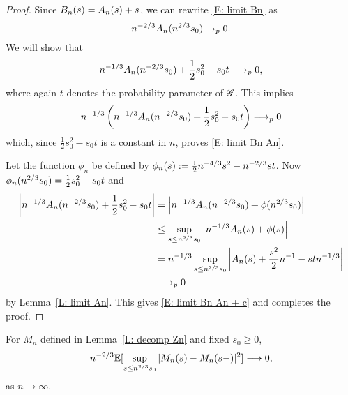 \begin{proof} \label{P: limit Bn}
	Since $B_n(s) = A_n(s) + s$, we can rewrite \eqref{E: limit Bn} as
	\begin{equation} \label{E: limit Bn An}
	n^{-2 / 3} A_n(n^{2 / 3}s_0) \rightarrow_p 0.
	\end{equation}
	We will show that
	\begin{equation} \label{E: limit Bn An + c}
	n^{-1 / 3} A_n(n^{-2 / 3}s_0) + \frac{1}{2}s_0^2 - s_0t \longrightarrow_p 0,
	\end{equation}
	where again $t$ denotes the probability parameter of $\mathscr{G}$. 
	This implies
	\begin{equation*}
	n^{-1 / 3} \left( n^{-1 / 3} A_n(n^{-2 / 3}s_0) + \frac{1}{2}s_0^2 - s_0t \right) \longrightarrow_p 0
	\end{equation*}
	which, since $\frac{1}{2}s_0^2 - s_0t$ is a constant in $n$, proves \eqref{E: limit Bn An}.
	
	Let the function $\phi_n$ be defined by $\phi_n(s) := \frac{1}{2}n^{-4 / 3}s^2 - n^{-2 / 3}st$.	
	Now $\phi_n(n^{2 / 3}s_0) = \frac{1}{2}s_0^2 - s_0t$ and
	\begin{align*}
	\left| n^{-1 / 3} A_n(n^{-2 / 3}s_0) + \frac{1}{2}s_0^2 - s_0t \right| 
	&= \left| n^{-1 / 3} A_n(n^{-2 / 3}s_0) + \phi(n^{2 / 3}s_0) \right| \\
	&\leq \sup_{s \leq n^{2 / 3} s_0 } \left| n^{-1 / 3} A_n(s) + \phi(s) \right| \\
	&= n^{-1 / 3} \sup_{s \leq n^{2 / 3} s_0 } \left| A_n(s) + \frac{s^2}{2}n^{-1} - stn^{-1 / 3} \right| \\
	&\longrightarrow_p 0
	\end{align*}
	by Lemma~\ref{L: limit An}. This gives \eqref{E: limit Bn An + c} and completes the proof.
\end{proof}


\begin{lemma} \label{L: limit Mn}
	For $M_n$ defined in Lemma~\ref{L: decomp Zn} and fixed $s_0 \geq 0$,
	\begin{equation} \label{E: limit Mn}
	n^{-2 / 3} \mathbb{E}[\sup_{s \leq n^{2 / 3} s_0 } |M_n(s) - M_n(s-)|^2] \longrightarrow 0,
	\end{equation}
	as $n\longrightarrow \infty$.
\end{lemma}

